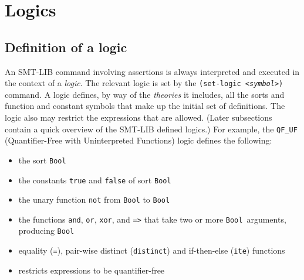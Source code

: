 \documentclass[12pt,oneside]{report}
\newcommand{\sym}{{\it <symbol>}}
\newcommand{\Bool}{{\tt Bool}}
\newcommand{\nospace}{\setlength{\itemsep}{0in}\setlength{\parsep}{0in}\setlength{\parskip}{0in}\setlength{\topsep}{0in}}
\begin{document}

\section{Logics}
\label{Logics}

\subsection{Definition of a logic}

An SMT-LIB command involving assertions is always interpreted and executed in the context of a {\em logic}.
The relevant logic is set by the {\tt (set-logic \sym)} command.  A logic defines, by way of the {\em theories} it
includes, all the sorts and function and constant symbols that make up the initial set of definitions.
The logic also may restrict the expressions that are allowed.
(Later subsections contain a quick overview of the SMT-LIB defined logics.)  For example, the 
{\tt QF\_UF} (Quantifier-Free with Uninterpreted Functions) logic defines the following:
\begin{itemize} \nospace
\item the sort {\tt Bool}
\item the constants {\tt true} and {\tt false} of sort {\tt Bool}
\item the unary function {\tt not} from {\tt Bool} to {\tt Bool}
\item the functions {\tt and}, {\tt or}, {\tt xor}, and {\tt =>} that take two or more \Bool~arguments, producing \Bool
\item equality ({\tt =}), pair-wise distinct ({\tt distinct}) and if-then-else ({\tt ite}) functions
\item restricts expressions to be quantifier-free
\end{itemize}
\end{document}
